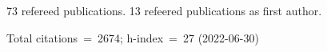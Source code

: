 73 refereed publications. 13 refeered publications as first author.

Total citations~=~2674; h-index~=~27 (2022-06-30)